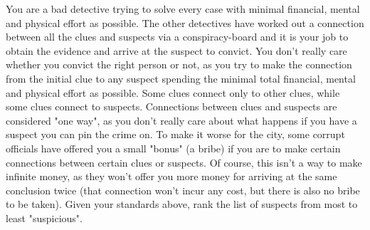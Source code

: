 

\par{You are a bad detective trying to solve every case with minimal financial, mental and physical effort as possible. The other detectives have worked out a connection between all the clues and suspects via a conspiracy-board and it is your job to obtain the evidence and arrive at the suspect to convict. You don't really care whether you convict the right person or not, as you try to make the connection from the initial clue to any suspect spending the minimal total financial, mental and physical effort as possible. Some clues connect only to other clues, while some clues connect to suspects. Connections between clues and suspects are considered "one way", as you don't really care about what happens if you have a suspect you can pin the crime on. To make it worse for the city, some corrupt officials have offered you a small "bonus" (a bribe) if you are to make certain connections between certain clues or suspects. Of course, this isn't a way to make infinite money, as they won't offer you more money for arriving at the same conclusion twice (that connection won't incur any cost, but there is also no bribe to be taken). Given your standards above, rank the list of suspects from most to least "suspicious". }

